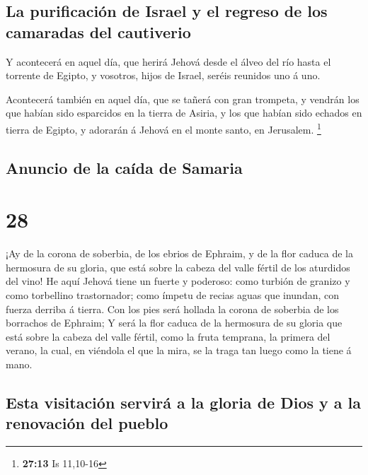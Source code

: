 \hypertarget{la-purificaciuxf3n-de-israel-y-el-regreso-de-los-camaradas-del-cautiverio}{%
\subsection{La purificación de Israel y el regreso de los camaradas del
cautiverio}\label{la-purificaciuxf3n-de-israel-y-el-regreso-de-los-camaradas-del-cautiverio}}

 Y acontecerá en aquel día, que herirá Jehová desde el
álveo del río hasta el torrente de Egipto, y vosotros, hijos de Israel,
seréis reunidos uno á uno.

 Acontecerá también en aquel día, que se tañerá con gran
trompeta, y vendrán los que habían sido esparcidos en la tierra de
Asiria, y los que habían sido echados en tierra de Egipto, y adorarán á
Jehová en el monte santo, en Jerusalem. \footnote{\textbf{27:13} Is
  11,10-16}

\hypertarget{anuncio-de-la-cauxedda-de-samaria}{%
\subsection{Anuncio de la caída de
Samaria}\label{anuncio-de-la-cauxedda-de-samaria}}

\hypertarget{section-27}{%
\section{28}\label{section-27}}

 ¡Ay de la corona de soberbia, de los ebrios de Ephraim, y
de la flor caduca de la hermosura de su gloria, que está sobre la cabeza
del valle fértil de los aturdidos del vino!  He aquí
Jehová tiene un fuerte y poderoso: como turbión de granizo y como
torbellino trastornador; como ímpetu de recias aguas que inundan, con
fuerza derriba á tierra.  Con los pies será hollada la
corona de soberbia de los borrachos de Ephraim;  Y será la
flor caduca de la hermosura de su gloria que está sobre la cabeza del
valle fértil, como la fruta temprana, la primera del verano, la cual, en
viéndola el que la mira, se la traga tan luego como la tiene á mano.

\hypertarget{esta-visitaciuxf3n-serviruxe1-a-la-gloria-de-dios-y-a-la-renovaciuxf3n-del-pueblo}{%
\subsection{Esta visitación servirá a la gloria de Dios y a la
renovación del
pueblo}\label{esta-visitaciuxf3n-serviruxe1-a-la-gloria-de-dios-y-a-la-renovaciuxf3n-del-pueblo}}

